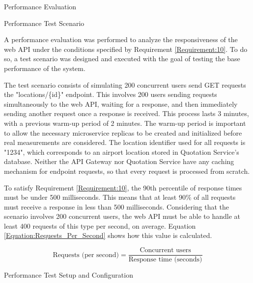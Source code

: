 \documentclass[12pt, reqno, oneside]{amsbook}
\makeatletter
\def\section{\@startsection{section}{1}%
      \z@{.5\linespacing\@plus.7\linespacing}{.25\linespacing}%
      {\normalfont\bfseries\flushleft}}
\def\subsection{\@startsection{subsection}{2}%
      \z@{.5\linespacing\@plus.7\linespacing}{.25\linespacing}%
      {\normalfont\bfseries\flushleft}}
\theoremstyle{definition}
\theoremstyle{definition}
\numberwithin{section}{chapter}
\numberwithin{table}{chapter}
\numberwithin{figure}{chapter}
\makeatother
\begin{document}
\pagebreak

\section{Performance Evaluation}
\label{Section:Performance_Evaluation}

\subsection{Performance Test Scenario}
\label{Subsection:Performance_Test_Scenario}

A performance evaluation was performed to analyze the responsiveness of the web \ac{API} under the conditions specified by Requirement \ref{Requirement:10}. To do so, a test scenario was designed and executed with the goal of testing the base performance of the system.

The test scenario consists of simulating 200 concurrent users send GET requests the "locations/\{id\}" endpoint. This involves 200 users sending requests simultaneously to the web \ac{API}, waiting for a response, and then immediately sending another request once a response is received. This process lasts 3 minutes, with a previous warm-up period of 2 minutes. The warm-up period is important to allow the necessary microservice replicas to be created and initialized before real measurements are considered. The location identifier used for all requests is "1234", which corresponds to an airport location stored in Quotation Service's database. Neither the \ac{API} Gateway nor Quotation Service have any caching mechanism for endpoint requests, so that every request is processed from scratch.

To satisfy Requirement \ref{Requirement:10}, the 90th percentile of response times must be under 500 milliseconds. This means that at least 90\% of all requests must receive a response in less than 500 milliseconds. Considering that the scenario involves 200 concurrent users, the web \ac{API} must be able to handle at least 400 requests of this type per second, on average. Equation \ref{Equation:Requests_Per_Second} shows how this value is calculated.

\begin{equation}
  \text{Requests (per second)} = \frac{\text{Concurrent users}}{\text{Response time (seconds)}}
  \label{Equation:Requests_Per_Second}
\end{equation}

\subsection{Performance Test Setup and Configuration}
\end{document}
